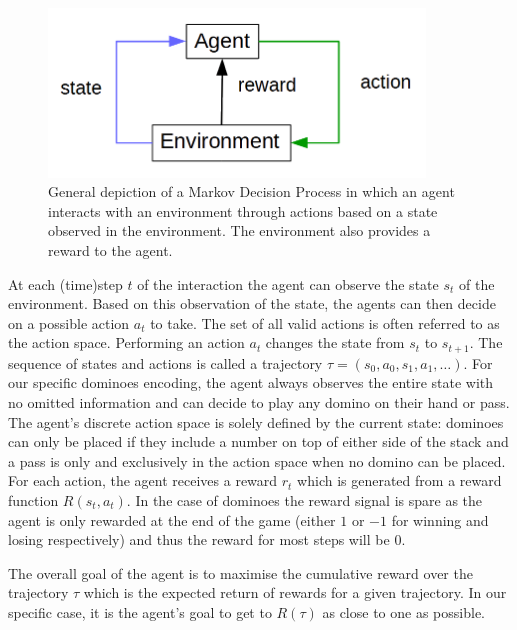 \documentclass[12pt,a4paper]{article}
\begin{document}
\begin{figure}
  \includegraphics[width=10cm]{img/mdp.png}
  \centering 
  \caption{General depiction of a Markov Decision Process in which an agent interacts with an environment through actions based on a state observed in the environment. The environment also provides a reward to the agent.}
  \label{fig:mdp}
 
\end{figure}

At each (time)step $t$ of the interaction the agent can observe the state $s_t$ of the environment. Based on this observation of the state, the agents can then decide on a possible action $a_t$ to take. The set of all valid actions is often referred to as the action space. Performing an action $a_t$ changes the state from $s_t$ to $s_{t+1}$. The sequence of states and actions is called a trajectory $\tau = (s_0, a_0, s_1, a_1, …)$. For our specific dominoes encoding, the agent always observes the entire state with no omitted information and can decide to play any domino on their hand or pass. The agent’s discrete action space is solely defined by the current state: dominoes can only be placed if they include a number on top of either side of the stack and a pass is only and exclusively in the action space when no domino can be placed. 
For each action, the agent receives a reward $r_t$ which is generated from a reward function $R(s_t, a_t)$. In the case of dominoes the reward signal is spare as the agent is only rewarded at the end of the game (either $1$ or $-1$ for winning and losing respectively) and thus the reward for most steps will be $0$. 

The overall goal of the agent is to maximise the cumulative reward over the trajectory $\tau$ which is the expected return of rewards for a given trajectory. In our specific case, it is the agent’s goal to get to $R(\tau)$ as close to one as possible. 
\end{document}
